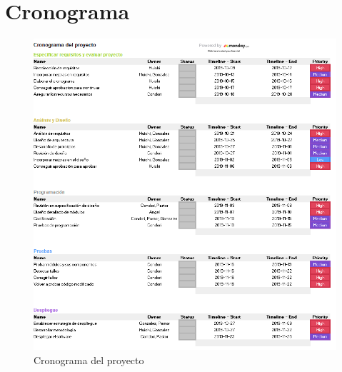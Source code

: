 \documentclass[preprint,12pt]{elsarticle}
\begin{document}

\section{Cronograma}

\begin{figure}[htb]
	\begin{center}
		\includegraphics[width=14cm]{./IMAGENES/Gannt} 
		\caption{Cronograma del proyecto}
	\end{center}
\end{figure}




	
	\newpage
	
		 
	
	
\end{document}

